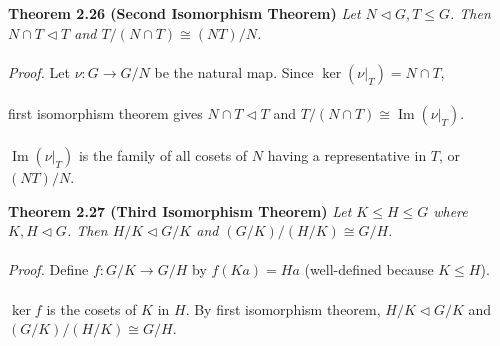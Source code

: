 \documentclass{article}
\DeclareMathOperator{\im}{Im}
\begin{document}
\begin{redrules}\color{red}
\textbf{Theorem 2.26 (Second Isomorphism Theorem)} \textit{Let \(N\vartriangleleft G,T\le G\). Then \(N\cap T\vartriangleleft T\) and \(T/(N\cap T)\cong (NT)/N\).}\\\\\color{black}
\textit{Proof.}  Let \(\nu:G\to G/N\) be the natural map. Since \(\ker(\nu|_{T})=N\cap T\),\\\\
first isomorphism theorem gives \(N\cap T\vartriangleleft T\) and \(T/(N\cap T)\cong \im(\nu|_{T})\).\\\\
\(\im(\nu|_{T})\) is the family of all cosets of \(N\) having a representative in \(T\), or \((NT)/N\).
\begin{center}
\end{center}
\end{redrules}
\begin{redrules}\color{red}
\textbf{Theorem 2.27 (Third Isomorphism Theorem)} \textit{Let \(K\le H\le G\) where \(K,H\vartriangleleft G\). Then \(H/K\vartriangleleft G/K\) and \((G/K)/(H/K)\cong G/H\).}\\\\\color{black}
\textit{Proof.} Define \(f:G/K\to G/H\) by \(f(Ka)=Ha\) (well-defined because \(K\le H\)).\\\\
\(\ker f\) is the cosets of \(K\) in \(H\). By first isomorphism theorem, \(H/K\vartriangleleft G/K\) and \((G/K)/(H/K)\cong G/H\).
\end{redrules}
\end{document}
